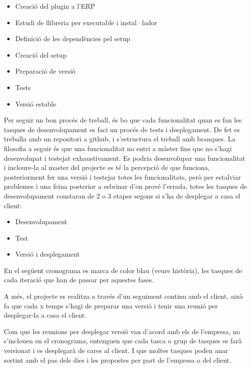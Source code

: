 \documentclass[letterpaper,11pt,catalan]{sphinxmanual}
\begin{document}
\begin{itemize}
\item {} 
Creació del plugin a l'ERP

\item {} 
Estudi de llibreria per executable i instal·lador

\item {} 
Definició de les dependències pel setup

\item {} 
Creació del setup

\item {} 
Preparació de versió

\item {} 
Tests

\item {} 
Versió estable

\end{itemize}

Per seguir un bon procés de treball, és bo que cada funcionalitat quan es fan les tasques
de desenvolupament es faci un procés de tests i desplegament. De fet es treballa amb un
repositori a github, i s'estructura el treball amb branques. La filosofia a seguir és que
una funcionalitat no entri a màster fins que no s'hagi desenvolupat i testejat exhaustivament.
Es podria desenvolupar una funcionalitat i incloure-la al master del projecte es té la percepció de que funciona,
posteriorment fer una versió i testejar totes les funcionalitats, però per estalviar problemes
i una feina posterior a esbrinar d'on prové l'errada, totes les tasques de desenvolupament
constaran de 2 o 3 etapes segons si s'ha de desplegar a casa el client:
\begin{itemize}
\item {} 
Desenvolupament

\item {} 
Test

\item {} 
Versió i desplegament

\end{itemize}

En el següent cronograma es marca de color blau (veure història), les tasques de cada iteració que
han de passar per aquestes fases.

A més, el projecte es realitza a través d'un seguiment continu amb el client, això fa que cada x temps s'hagi
de preparar una versió i tenir una reunió per desplegar-la a casa el client.

Com que les reunions per desplegar versió van d'acord amb els  de l'empresa, no s'inclouen en el
cronograma, entenguen que cada tasca o grup de tasques es farà versionat i es desplegarà de cares al client.
I que moltes tasques poden anar sortint amb el pas dels dies i les propostes per part de l'empresa o del client.
\end{document}
